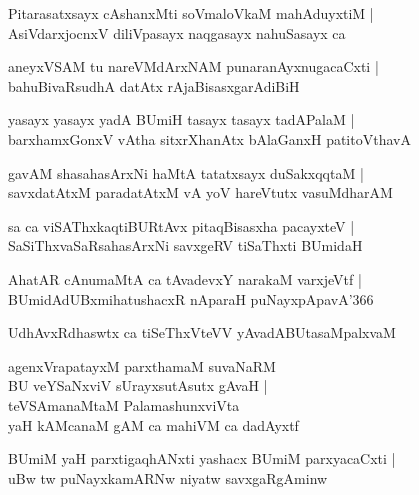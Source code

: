\documentclass[twoside,12pt,openright]{book}
\newcounter{shloka}[chapter]
\begin{document}
\begin{shloka}%
Pitarasatxsayx cAshanxMti soVmaloVkaM mahAduyxtiM |\\
AsiVdarxjocnxV diliVpasayx naqgasayx nahuSasayx ca 
\end{shloka}

\begin{shloka}%
aneyxVSAM tu nareVMdArxNAM punaranAyxnugacaCxti |\\
bahuBivaRsudhA datAtx rAjaBisasxgarAdiBiH
\end{shloka}

\begin{shloka}%
yasayx yasayx yadA BUmiH tasayx tasayx tadAPalaM |\\
barxhamxGonxV vAtha sitxrXhanAtx bAlaGanxH patitoVthavA
\end{shloka}

\begin{shloka}%
gavAM shasahasArxNi haMtA tatatxsayx duSakxqqtaM |\\
savxdatAtxM paradatAtxM vA yoV hareVtutx vasuMdharAM 
\end{shloka}

\begin{shloka}%
sa ca viSAThxkaqtiBURtAvx pitaqBisasxha pacayxteV |\\
SaSiThxvaSaRsahasArxNi savxgeRV tiSaThxti BUmidaH
\end{shloka}

\begin{shloka}%
AhatAR cAnumaMtA ca tAvadevxY narakaM varxjeVtf |\\
BUmidAdUBxmihatushacxR nAparaH puNayxpApavA\char'366 
\end{shloka}

\begin{shloka}%
UdhAvxRdhaswtx ca tiSeThxVteVV yAvadABUtasaMpalxvaM
\end{shloka}

\begin{shloka}%
agenxVrapatayxM parxthamaM suvaNaRM \\
BU veYSaNxviV sUrayxsutAsutx gAvaH |\\
teVSAmanaMtaM PalamashunxviVta \\
yaH kAMcanaM gAM ca mahiVM ca dadAyxtf
\end{shloka}

\begin{shloka}%
BUmiM yaH parxtigaqhANxti yashacx BUmiM parxyacaCxti |\\
uBw tw puNayxkamARNw niyatw savxgaRgAminw 
\end{shloka}
\end{document}
